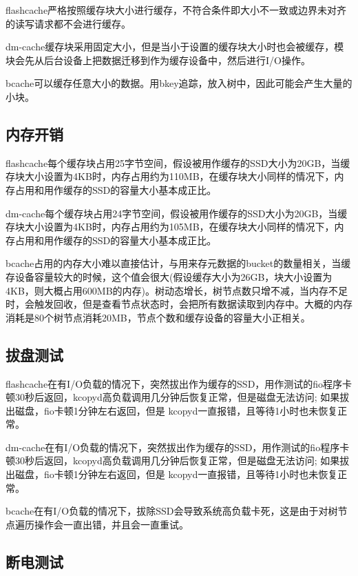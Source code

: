 flashcache严格按照缓存块大小进行缓存，不符合条件即大小不一致或边界未对齐的读写请求都不会进行缓存。

dm-cache缓存块采用固定大小，但是当小于设置的缓存块大小时也会被缓存，模块会先从后台设备上把数据迁移到作为缓存设备中，然后进行I/O操作。 

bcache可以缓存任意大小的数据。用bkey追踪，放入树中，因此可能会产生大量的小块。

\subsection{内存开销}

flashcache每个缓存块占用25字节空间，假设被用作缓存的SSD大小为20GB，当缓存块大小设置为4KB时，内存占用约为110MB，在缓存块大小同样的情况下，内存占用和用作缓存的SSD的容量大小基本成正比。  

dm-cache每个缓存块占用24字节空间，假设被用作缓存的SSD大小为20GB，当缓存块大小设置为4KB时，内存占用约为105MB，在缓存块大小同样的情况下，内存占用和用作缓存的SSD的容量大小基本成正比。

bcache占用的内存大小难以直接估计，与用来存元数据的bucket的数量相关，当缓存设备容量较大的时候，这个值会很大(假设缓存大小为26GB，块大小设置为4KB，则大概占用600MB的内存)。树动态增长，树节点数只增不减，当内存不足时，会触发回收，但是查看节点状态时，会把所有数据读取到内存中。大概的内存消耗是80个树节点消耗20MB，节点个数和缓存设备的容量大小正相关。

\subsection{拔盘测试}

flashcache在有I/O负载的情况下，突然拔出作为缓存的SSD，用作测试的fio程序卡顿30秒后返回，kcopyd高负载调用几分钟后恢复正常，但是磁盘无法访问; 如果拔出磁盘，fio卡顿1分钟左右返回，但是 kcopyd一直报错，且等待1小时也未恢复正常。   

dm-cache在有I/O负载的情况下，突然拔出作为缓存的SSD，用作测试的fio程序卡顿30秒后返回，kcopyd高负载调用几分钟后恢复正常，但是磁盘无法访问; 如果拔出磁盘，fio卡顿1分钟左右返回，但是 kcopyd一直报错，且等待1小时也未恢复正常。 

bcache在有I/O负载的情况下，拔除SSD会导致系统高负载卡死，这是由于对树节点遍历操作会一直出错，并且会一直重试。 

\subsection{断电测试}

